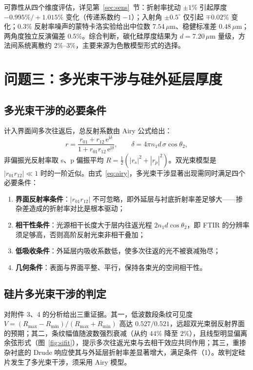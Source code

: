 \documentclass[11pt,a4paper,fontset=fandol]{ctexart}
\newcommand{\um}{\,\mu\mathrm{m}}
\begin{document}
可靠性从四个维度评估，详见第~\ref{sec:sens}~节：折射率扰动 $\pm1\%$ 引起厚度 $-0.995\%/+1.015\%$ 变化（传递系数约 $-1$）；入射角 $\pm0.5^\circ$ 仅引起 $\mp0.02\%$ 变化；$0.3\%$ 反射率噪声的蒙特卡洛实验给出中位数 $7.54\um$、稳健标准差 $0.48\um$；两角度独立反演偏差 $0.5\%$。综合判断，碳化硅厚度结果为 $d=7.20\um$ 量级，方法间系统离散约 $2\%\text{--}3\%$，主要来源为色散模型形式的选择。

\section{问题三：多光束干涉与硅外延层厚度}

\subsection{多光束干涉的必要条件}

计入界面间多次往返后，总反射系数由 Airy 公式给出\cite{born1999}：
\begin{equation}
    r = \frac{r_{01}+r_{12}\,\mathrm{e}^{\mathrm{i}\delta}}{1+r_{01}r_{12}\,\mathrm{e}^{\mathrm{i}\delta}},
    \qquad
    \delta = 4\pi n_1 d\,\sigma\cos\theta_2,
    \label{eq:airy}
\end{equation}
非偏振光反射率取 s、p 偏振平均 $R=\tfrac12(|r_s|^2+|r_p|^2)$。双光束模型是 $|r_{01}r_{12}|\ll1$ 时的一阶近似。由式~\eqref{eq:airy}，多光束干涉显著出现需同时满足四个必要条件：
\begin{enumerate}[label=（\arabic*）, leftmargin=2.4em, itemsep=0.1em]
    \item \textbf{界面反射率条件}：$|r_{01}r_{12}|$ 不可忽略，即外延层与衬底折射率差足够大——掺杂差造成的折射率对比是根本驱动；
    \item \textbf{相干性条件}：光源相干长度大于层内往返光程 $2n_1d\cos\theta_2$，即 FTIR 的分辨率须足够高，否则高阶反射光束非相干叠加；
    \item \textbf{低吸收条件}：外延层内吸收系数低，使多次往返的光不被衰减殆尽；
    \item \textbf{几何条件}：表面与界面平整、平行，保持各束光的空间相干性。
\end{enumerate}

\subsection{硅片多光束干涉的判定}

对附件 3、4 的分析给出三重证据。其一，低波数段条纹可见度 $V=(R_{\max}-R_{\min})/(R_{\max}+R_{\min})$ 高达 $0.527/0.521$，远超双光束弱反射界面的预期；其二，条纹幅值随波数强烈衰减（从约 $44\%$ 降至 $2\%$），且线型明显偏离余弦形式（图~\ref{fig:sifit}），提示多次往返光束与去相干效应共同作用；其三，重掺杂衬底的 Drude 响应使其与外延层折射率差显著增大，满足条件（1）。故判定硅片发生了多光束干涉，须采用 Airy 模型。
\end{document}
